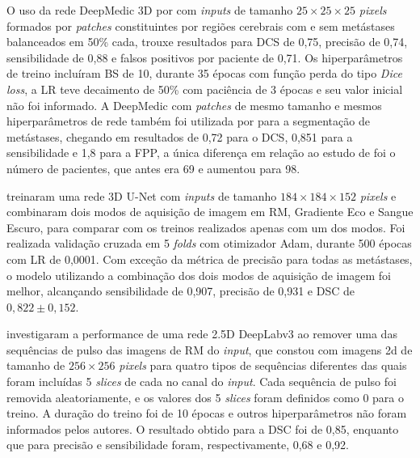 O uso da rede DeepMedic 3D por \cite{Pennig:2021} com \textit{inputs} de tamanho $25\times25\times25$ \textit{pixels} formados por \textit{patches} constituintes por regiões cerebrais com e sem metástases balanceados em 50\% cada, trouxe resultados para DCS de 0,75, precisão de 0,74, sensibilidade de 0,88 e falsos positivos por paciente de 0,71. Os hiperparâmetros de treino incluíram BS de 10, durante 35 épocas com função perda do tipo \textit{Dice loss}, a LR teve decaimento de 50\% com paciência de 3 épocas e seu valor inicial não foi informado. A DeepMedic com \textit{patches} de mesmo tamanho e mesmos hiperparâmetros de rede também foi utilizada por \cite{Jünger:2021} para a segmentação de metástases, chegando em resultados de 0,72 para o DCS, 0,851 para a sensibilidade e 1,8 para a FPP, a única diferença em relação ao estudo de \cite{Pennig:2021} foi o número de pacientes, que antes era 69 e aumentou para 98.

\cite{Park:2021} treinaram uma rede 3D U-Net com \textit{inputs} de tamanho $184\times184\times152$ \textit{pixels} e combinaram dois modos de aquisição de imagem em RM, Gradiente Eco e Sangue Escuro, para comparar com os treinos realizados apenas com um dos modos. Foi realizada validação cruzada em 5 \textit{folds} com otimizador Adam, durante 500 épocas com LR de 0,0001. Com exceção da métrica de precisão para todas as metástases, o modelo utilizando a combinação dos dois modos de aquisição de imagem foi melhor, alcançando sensibilidade de 0,907, precisão de 0,931 e DSC de $0,822 \pm 0,152$.

\cite{Yi:2021} investigaram a performance de uma rede 2.5D DeepLabv3 ao remover uma das sequências de pulso das imagens de RM do \textit{input}, que constou com imagens 2d de tamanho de $256\times256$ \textit{pixels} para quatro tipos de sequências diferentes das quais foram incluídas 5 \textit{slices} de cada no canal do \textit{input}. Cada sequência de pulso foi removida aleatoriamente, e os valores dos 5 \textit{slices} foram definidos como 0 para o treino. A duração do treino foi de 10 épocas e outros hiperparâmetros não foram informados pelos autores. O resultado obtido para a DSC foi de 0,85, enquanto que para precisão e sensibilidade foram, respectivamente, 0,68 e 0,92.

